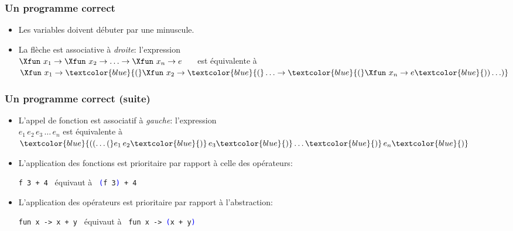 %
\begin{frame}
\frametitle{Un programme correct}

{\small
{}




}

\bigskip

\remarques

\begin{itemize}

  \item Les variables doivent débuter par une minuscule.

  \item La flèche est associative à \emph{droite}: l'expression\\
  $\Xfun \,\, x_1 \rightarrow \Xfun \,\, x_2 \rightarrow \ldots
  \rightarrow \Xfun \,\, x_n \rightarrow e$ \ \ \ est équivalente à\\
  $\Xfun \,\, x_1 \rightarrow \textcolor{blue}{(}\Xfun \,\, x_2 \rightarrow
  \textcolor{blue}{(}\ldots \rightarrow \textcolor{blue}{(}\Xfun \,\, x_n \rightarrow
  e\textcolor{blue}{)) \ldots)}$

\end{itemize}

\end{frame}

%
\begin{frame}
\frametitle{Un programme correct (suite)}

\begin{itemize}

  \item L'appel de fonction est associatif à \emph{gauche}:
  l'expression\\ $e_1 \, e_2 \, e_3 \, \ldots \, e_n$ est équivalente
  à $\textcolor{blue}{((\ldots (}e_1 \, e_2\textcolor{blue}{)} \, e_3\textcolor{blue}{)} \ldots
  \textcolor{blue}{)} \, e_n\textcolor{blue}{)}$

  \item L'application des fonctions est prioritaire par rapport à
  celle des opérateurs:
  \begin{center}
    \texttt{f 3 + 4} \ équivaut à \ \texttt{\textcolor{blue}{(}f 3\textcolor{blue}{)} +
    4}
  \end{center}

  \item L'application des opérateurs est prioritaire par rapport à
  l'abstraction:
  \begin{center}
    \texttt{fun x -> x + y} \ équivaut à \ \texttt{fun x ->
    \textcolor{blue}{(}x + y\textcolor{blue}{)}}
  \end{center}

\end{itemize}

\end{frame}

